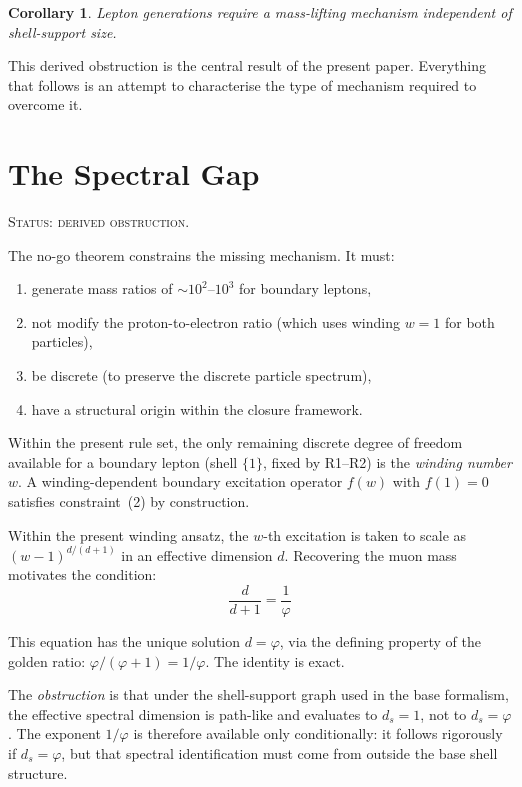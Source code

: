 \documentclass[12pt]{article}
\newtheorem{corollary}[theorem]{Corollary}
\newcommand{\phig}{\varphi}
\newcommand{\ds}{d_s}
\begin{document}
\begin{corollary}
Lepton generations require a mass-lifting mechanism independent of shell-support size.
\end{corollary}

This derived obstruction is the central result of the present paper. Everything that follows is an attempt to characterise the type of mechanism required to overcome it.

\section{The Spectral Gap}\label{sec:gap}

\textsc{Status: derived obstruction.}

The no-go theorem constrains the missing mechanism. It must:
\begin{enumerate}
    \item generate mass ratios of $\sim\!10^2$--$10^3$ for boundary leptons,
    \item not modify the proton-to-electron ratio (which uses winding $w = 1$ for both particles),
    \item be discrete (to preserve the discrete particle spectrum),
    \item have a structural origin within the closure framework.
\end{enumerate}

Within the present rule set, the only remaining discrete degree of freedom available for a boundary lepton (shell $\{1\}$, fixed by R1--R2) is the \textit{winding number} $w$. A winding-dependent boundary excitation operator $f(w)$ with $f(1) = 0$ satisfies constraint~(2) by construction.

Within the present winding ansatz, the $w$-th excitation is taken to scale as $(w - 1)^{d/(d+1)}$ in an effective dimension $d$. Recovering the muon mass motivates the condition:
\[
\frac{d}{d+1} = \frac{1}{\phig}
\]

This equation has the unique solution $d = \phig$, via the defining property of the golden ratio: $\phig/({\phig+1}) = 1/\phig$. The identity is exact.

The \textit{obstruction} is that under the shell-support graph used in the base formalism, the effective spectral dimension is path-like and evaluates to $\ds = 1$, not to $\ds = \phig$. The exponent $1/\phig$ is therefore available only conditionally: it follows rigorously if $\ds = \phig$, but that spectral identification must come from outside the base shell structure.
\end{document}

